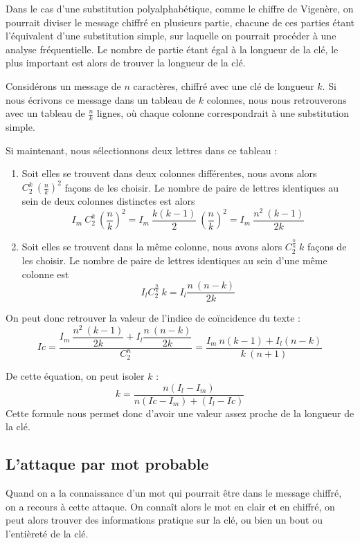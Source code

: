 Dans le cas d'une substitution polyalphabétique, comme le chiffre
de Vigenère, on pourrait diviser le message chiffré en plusieurs
partie, chacune de ces parties étant l'équivalent d'une
substitution simple, sur laquelle on pourrait procéder à une
analyse fréquentielle. Le nombre de partie étant égal à la
longueur de la clé, le plus important est alors de trouver la
longueur de la clé.

Considérons un message de $n$ caractères, chiffré avec une clé de
longueur $k$. Si nous écrivons ce message dans un tableau de $k$
colonnes, nous nous retrouverons avec un tableau de $\frac{n}{k}$
lignes, où chaque colonne correspondrait à une substitution
simple.

Si maintenant, nous sélectionnons deux lettres dans ce tableau :
\begin{enumerate}
  \item Soit elles se trouvent dans deux colonnes différentes, 
nous avons
alors $C^k_2 ~ (\frac{n}{k})^2$ façons de les choisir. Le nombre
de paire de lettres identiques au sein de deux colonnes distinctes
est alors
\[ I_m ~ C^k_2 ~ \left(\dfrac{n}{k}\right)^2 = 
I_m ~ \dfrac{k (k - 1)}{2} ~
\left(\dfrac{n}{k}\right)^2 = I_m ~ \dfrac{n^2 ~ (k-1)}{2k} \]
  \item Soit elles se trouvent dans la même colonne, nous avons
alors $C^{\frac{n}{k}}_2 ~ k $ façons de les choisir. Le nombre de paire de lettres
identiques au sein d'une même colonne est
\[ I_l C^{\frac{n}{k}}_2 ~ k = I_l
\dfrac{n ~ (n-k)}{2k} \]
\end{enumerate}

On peut donc retrouver la valeur de l'indice de coïncidence du
texte :
\[Ic = \dfrac{I_m ~ \dfrac{n^2 ~ (k-1)}{2k} +
I_l \dfrac{n ~ (n-k)}{2k}}{C^n_2} =
\dfrac{I_m ~ n (k-1) + I_l (n-k)}{k ~
(n+1)} \]

De cette équation, on peut isoler $k$ :
\[k = \dfrac{n (I_l - I_m)}{n (Ic - I_m) + (I_l - Ic)} \]
Cette formule nous permet donc d'avoir une valeur assez proche de
la longueur de la clé.


\subsection{L'attaque par mot probable\label{sec:MotProbable}}
Quand on a la connaissance d'un mot qui pourrait être dans le
message chiffré, on a recours à cette attaque. On connaît alors le
mot en clair et en chiffré, on peut alors trouver des informations
pratique sur la clé, ou bien un bout ou l'entièreté de la clé.


